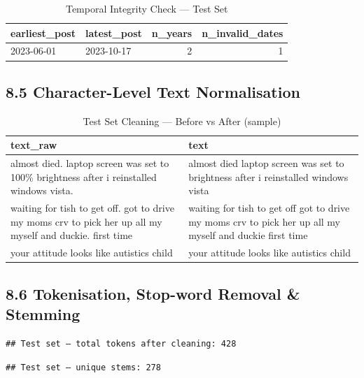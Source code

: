 \documentclass[
]{article}
\begin{document}
\begin{longtable}[t]{llrr}
\caption{\label{tab:test-date-validation}Temporal Integrity Check — Test Set}\\
\toprule
earliest\_post & latest\_post & n\_years & n\_invalid\_dates\\
\midrule
2023-06-01 & 2023-10-17 & 2 & 1\\
\bottomrule
\end{longtable}

\subsection{8.5 Character-Level Text
Normalisation}\label{character-level-text-normalisation}

\begin{table}[!h]
\centering
\caption{\label{tab:test-text-cleaning}Test Set Cleaning — Before vs After (sample)}
\centering
\fontsize{10}{12}\selectfont
\begin{tabular}[t]{>{\raggedright\arraybackslash}p{6cm}>{\raggedright\arraybackslash}p{6cm}}
\toprule
\textbf{text\_raw} & \textbf{text}\\
\midrule
almost died. laptop screen was set to 100\% brightness
after i reinstalled windows vista. & almost died laptop screen was set to brightness after i
reinstalled windows vista\\
waiting for tish to get off. got to drive my moms crv
to pick her up all my myself and duckie. first time & waiting for tish to get off got to drive my moms crv to
pick her up all my myself and duckie first time\\
your attitude looks like autistics child & your attitude looks like autistics child\\
\bottomrule
\end{tabular}
\end{table}

\subsection{8.6 Tokenisation, Stop-word Removal \&
Stemming}\label{tokenisation-stop-word-removal-stemming-1}

\begin{verbatim}
## Test set — total tokens after cleaning: 428
\end{verbatim}

\begin{verbatim}
## Test set — unique stems: 278
\end{verbatim}
\end{document}
